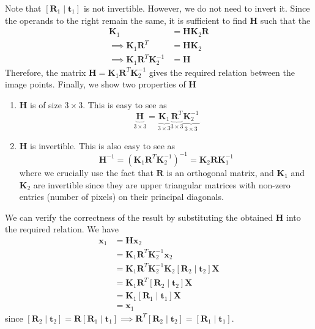 \documentclass[10pt]{article}
\newcommand{\orientation}[1]{\left[ \mathbf{R}_{#1} \mid \mathbf{t}_{#1} \right]}
\begin{document}
    Note that $\orientation{1}$ is not invertible. However, we do not need to invert it. Since the
    operands to the right remain the same, it is sufficient to find $\mathbf{H}$ such that the
    \begin{align*}
        \mathbf{K}_{1} &= \mathbf{H} \mathbf{K}_{2} \mathbf{R} \\
        \implies \mathbf{K}_{1} \mathbf{R}^{T} &= \mathbf{H} \mathbf{K}_{2} \\
        \implies \mathbf{K}_{1} \mathbf{R}^{T} \mathbf{K}_{2}^{-1} &= \mathbf{H}
    \end{align*}
    Therefore, the matrix $\mathbf{H} = \mathbf{K}_{1} \mathbf{R}^{T} \mathbf{K}_{2}^{-1}$ gives the
    required relation between the image points. Finally, we show two properties of $\mathbf{H}$
    \begin{enumerate}
        \item $\mathbf{H}$ is of size $3 \times 3$. This is easy to see as
        \begin{equation*}
            \underbrace{\mathbf{H}}_{3 \times 3} = \underbrace{\mathbf{K}_{1}}_{3 \times 3}
            \underbrace{\mathbf{R}^{T}}_{3 \times 3} \underbrace{\mathbf{K}_{2}^{-1}}_{3 \times 3}
        \end{equation*}

        \item $\mathbf{H}$ is invertible. This is also easy to see as
        \begin{equation*}
            \mathbf{H}^{-1} = \left( \mathbf{K}_{1} \mathbf{R}^{T} \mathbf{K}_{2}^{-1} \right)^{-1}
            = \mathbf{K}_{2} \mathbf{R} \mathbf{K}_{1}^{-1}
        \end{equation*}
        where we crucially use the fact that $\mathbf{R}$ is an orthogonal matrix, and $\mathbf{K}_{1}$
        and $\mathbf{K}_{2}$ are invertible since they are upper triangular matrices with non-zero
        entries (number of pixels) on their principal diagonals.
    \end{enumerate}
    We can verify the correctness of the result by substituting the obtained $\mathbf{H}$ into the
    required relation. We have
    \begin{align*}
        \mathbf{x}_{1} &= \mathbf{H} \mathbf{x}_{2} \\
        &= \mathbf{K}_{1} \mathbf{R}^{T} \mathbf{K}_{2}^{-1} \mathbf{x}_{2} \\
        &= \mathbf{K}_{1} \mathbf{R}^{T} \mathbf{K}_{2}^{-1} \mathbf{K}_{2} \orientation{2} \mathbf{X} \\
        &= \mathbf{K}_{1} \mathbf{R}^{T} \orientation{2} \mathbf{X} \\
        &= \mathbf{K}_{1} \orientation{1} \mathbf{X} \\
        &= \mathbf{x}_{1}
    \end{align*}
    since $\orientation{2} = \mathbf{R} \orientation{1} \implies \mathbf{R}^{T} \orientation{2} = \orientation{1}$.
\end{document}
